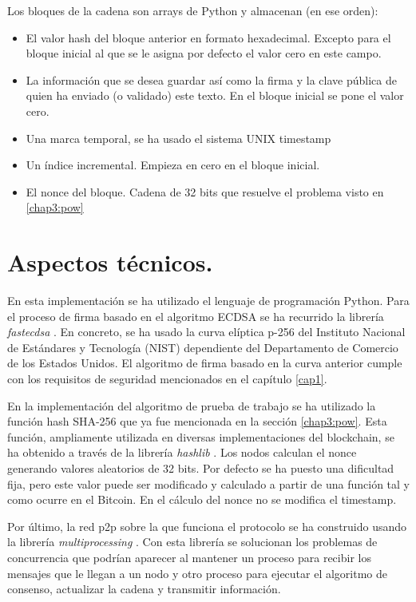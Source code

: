 Los bloques de la cadena son arrays de Python y almacenan (en ese orden):
\begin{itemize}
\item El valor hash del bloque anterior en formato hexadecimal. Excepto para el bloque inicial al que se le asigna por defecto el valor cero en este campo.
\item La información que se desea guardar así como la firma y la clave pública de quien ha enviado (o validado) este texto. En el bloque inicial se pone el valor cero.
\item Una marca temporal, se ha usado el sistema UNIX timestamp
\item Un índice incremental. Empieza en cero en el bloque inicial.  
\item El nonce del bloque. Cadena de 32 bits que resuelve el problema visto en \ref{chap3:pow}
\end{itemize}


\section{Aspectos técnicos.}
En esta implementación se ha utilizado el lenguaje de programación Python. Para el proceso de firma basado en el algoritmo ECDSA se ha recurrido la librería \textit{fastecdsa} \citep{fastecdsa}. En concreto, se ha usado la curva elíptica p-256 del Instituto Nacional de Estándares y Tecnología (NIST) dependiente del Departamento de Comercio de los Estados Unidos. El algoritmo de firma basado en la curva anterior cumple con los requisitos de seguridad mencionados en el capítulo \ref{cap1}.

En la implementación del algoritmo de prueba de trabajo se ha utilizado la función hash SHA-256 que ya fue mencionada en la sección \ref{chap3:pow}. Esta función, ampliamente utilizada en diversas implementaciones del blockchain, se ha obtenido a través de la librería \textit{hashlib} \citep{hashlib}. Los nodos calculan el nonce generando valores aleatorios de 32 bits. Por defecto se ha puesto una dificultad fija, pero este valor puede ser modificado y calculado a partir de una función tal y como ocurre en el Bitcoin. En el cálculo del nonce no se modifica el timestamp.

Por último, la red p2p sobre la que funciona el protocolo se ha construido usando la librería \textit{multiprocessing} \citep{multiprocessing}. Con esta librería se solucionan los problemas de concurrencia que podrían aparecer al mantener un proceso para recibir los mensajes que le llegan a un nodo y otro proceso para ejecutar el algoritmo de consenso, actualizar la cadena y transmitir información.

